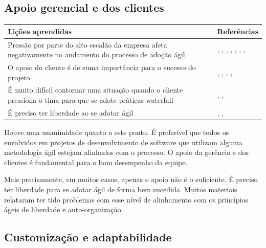 \subsection{Apoio gerencial e dos clientes}

\begin{table}[H]
	\centering
	\begin{tabularx}{\linewidth}{ | X | p{5cm} | } \hline \textbf{Lições aprendidas} & \textbf{Referências} \\ \hline
		Pressão por parte do alto escalão da empresa afeta negativamente no andamento do processo de adoção ágil & \cite{Hajjdiab2011}, \cite{Cisco2011}, \cite{Claudia2013}, \cite{Parzinello2012}, \cite{Stefano2013}, \cite{Bastos2013}, \cite{Maciel2013}, \cite{Srinath2012} \\ \hline
		O apoio do cliente é de suma importância para o sucesso do projeto & \cite{Arikpo2011}, \cite{Claudia2013}, \cite{Parzinello2012}, \cite{Stefano2013}, \cite{Maciel2013} \\ \hline
		É muito difícil contornar uma situação quando o cliente pressiona o tima para que se adote práticas waterfall & \cite{Claudia2013}, \cite{Piegas2012}, \cite{Srinath2012} \\ \hline
		É preciso ter liberdade ao se adotar ágil & \cite{Piegas2012}, \cite{Stefano2013}, \cite{Maciel2013} \\ \hline
	\end{tabularx}
\end{table}

Houve uma unanimidade quanto a este ponto. É preferível que todos os envolvidos em projetos de desenvolvimento de software que utilizam alguma metodologia ágil estejam alinhados com o processo. O apoio da gerência e dos clientes é fundamental para o bom desempenho da equipe.

Mais precisamente, em muitos casos, apenas o apoio não é o suficiente. É preciso ter liberdade para se adotar ágil de forma bem sucedida. Muitos materiais \cite{Piegas2012,Stefano2013,Maciel2013} relataram ter tido problemas com esse nível de alinhamento com os princípios ágeis de liberdade e auto-organização.

\subsection{Customização e adaptabilidade}


